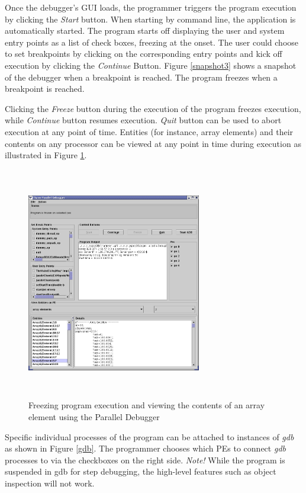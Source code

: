 
Once the debugger's GUI loads, the programmer triggers the program execution by
clicking the \textit{Start} button. When starting by command line, the
application is automatically started. The program starts off displaying the user
and system entry points as a list of check boxes, freezing at the onset. The
user could choose to set breakpoints by clicking on the corresponding entry
points and kick off execution by clicking the \textit{Continue} Button. Figure
\ref{snapshot3} shows a snapshot of the debugger when a breakpoint is reached. 
The program freezes when a breakpoint is reached.

 
Clicking the \textit{Freeze} button during the execution of the program freezes
execution, while \textit{Continue} button resumes execution. \textit{Quit}
button can be used to abort execution at any point of time. Entities (for
instance, array elements) and their contents on any processor can be viewed at
any point in time during execution as illustrated in Figure \ref{arrayelement}.

\begin{figure}[]
\includegraphics[scale=0.5, height=4in,width=3in]{figs/arrayelement}
\caption{Freezing program execution and viewing the contents of an array element using the Parallel Debugger}
\label{arrayelement}
\end{figure} 

Specific individual processes of the \charmpp{} program can be attached to instances of \textit{gdb} 
as shown in Figure \ref{gdb}. The programmer chooses which PEs to connect \textit{gdb} processes to via the checkboxes on the right side.
\emph{Note!} While the program is suspended in gdb for step debugging, the high-level features such as object inspection will not work.

